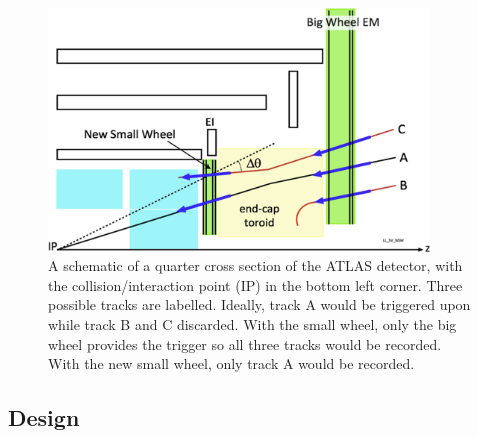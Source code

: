 \begin{figure}
    \centering
    \includegraphics[width = 0.9\textwidth]{figures/perez-codina_NSW_tracks.jpg}
    \caption{A schematic of a quarter cross section of the ATLAS detector, with the collision/interaction point (IP) in the bottom left corner. Three possible tracks are labelled. Ideally, track A would be triggered upon while track B and C discarded. With the small wheel, only the big wheel provides the trigger so all three tracks would be recorded. With the new small wheel, only track A would be recorded.}
    \label{fig:nsw_track_triggering}
\end{figure}

\subsection{Design}



